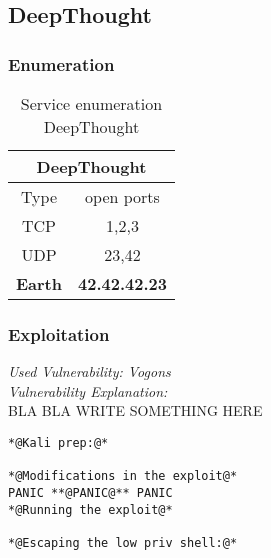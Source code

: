 \renewcommand{\hostname}{DeepThought}
\renewcommand{\os}{Earth}
\renewcommand{\ip}{42.42.42.23}
\renewcommand{\tcpports}{1,2,3}
\renewcommand{\udpports}{23,42}
\renewcommand{\vuln}{Vogons}
\toggletrue{priv}

 
\subsection{\hostname}
\subsubsection{Enumeration}

	\label{tab:\hostname}
\begin{longtable}{|c|c|}
\caption{Service enumeration \hostname}\\
\hline
\multicolumn{2}{|c|}{\textbf{\hostname}}\\
\hline
\hline
Type&open ports\\
\hline
TCP&\tcpports{}\\
\hline
UDP&\udpports{}\\

\hline
\hline
\multicolumn{1}{|c|}{\textbf{\os}}&\multicolumn{1}{|c|}{\textbf{\ip}}\\
\hline


\end{longtable}
\subsubsection{Exploitation}

\textit{Used Vulnerability: \vuln}\\

\textit{Vulnerability Explanation:}\\

BLA BLA WRITE SOMETHING HERE 


\begin{lstlisting}[caption={Exploitation of \hostname},label=\hostname-exploit]
*@Kali prep:@*

*@Modifications in the exploit@*
PANIC **@PANIC@** PANIC
*@Running the exploit@*

*@Escaping the low priv shell:@*
\end{lstlisting}


